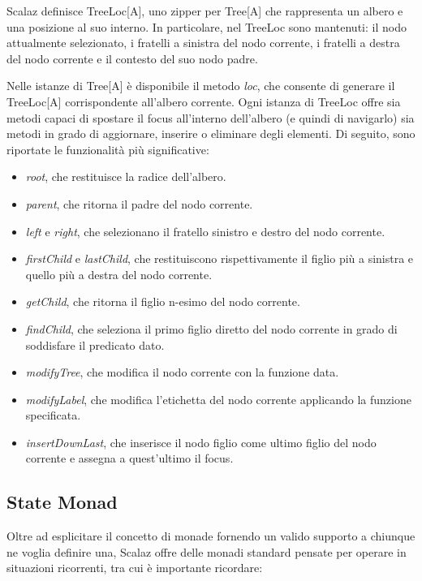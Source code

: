 Scalaz definisce TreeLoc[A], uno zipper per Tree[A] che rappresenta un albero e una posizione al suo interno. In particolare, nel TreeLoc sono mantenuti: il nodo attualmente selezionato, i fratelli a sinistra del nodo corrente, i fratelli a destra del nodo corrente e il contesto del suo nodo padre.

Nelle istanze di Tree[A] è disponibile il metodo \textit{loc}, che consente di generare il TreeLoc[A] corrispondente all'albero corrente. Ogni istanza di TreeLoc offre sia metodi capaci di spostare il focus all'interno dell'albero (e quindi di navigarlo) sia metodi in grado di aggiornare, inserire o eliminare degli elementi. Di seguito, sono riportate le funzionalità più significative:

\begin{itemize}
\item \textit{root}, che restituisce la radice dell'albero.
\item \textit{parent}, che ritorna il padre del nodo corrente.
\item \textit{left} e \textit{right}, che selezionano il fratello sinistro e destro del nodo corrente.
\item \textit{firstChild} e \textit{lastChild}, che restituiscono rispettivamente il figlio più a sinistra e quello più a destra del nodo corrente.
\item \textit{getChild}, che ritorna il figlio n-esimo del nodo corrente.
\item \textit{findChild}, che seleziona il primo figlio diretto del nodo corrente in grado di soddisfare il predicato dato.
\item \textit{modifyTree}, che modifica il nodo corrente con la funzione data.
\item \textit{modifyLabel}, che modifica l'etichetta del nodo corrente applicando la funzione specificata.
\item \textit{insertDownLast}, che inserisce il nodo figlio come ultimo figlio del nodo corrente e assegna a quest'ultimo il focus.
\end{itemize}



\subsection{State Monad}

Oltre ad esplicitare il concetto di monade fornendo un valido supporto a chiunque ne voglia definire una, Scalaz offre delle monadi standard pensate per operare in situazioni ricorrenti, tra cui è importante ricordare:

